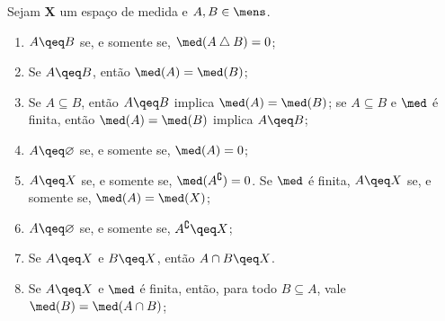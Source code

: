\begin{prop}
Sejam $\bm X$ um espaço de medida e $A,B \in \mens$.
	\begin{enumerate}
	\item $A \qeq B$ se, e somente se, $\med(A \difsim B) = 0$;
	\item Se $A \qeq B$, então $\med(A)=\med(B)$;
	\item Se $A \subseteq B$, então $A \qeq B$ implica $\med(A)=\med(B)$; se $A \subseteq B$ e $\med$ é finita, então $\med(A)=\med(B)$ implica $A \qeq B$;
	\item $A \qeq \emptyset$ se, e somente se, $\med(A)=0$;
	\item $A \qeq X$ se, e somente se, $\med(A^\complement)=0$. Se $\med$ é finita, $A \qeq X$ se, e somente se, $\med(A)=\med(X)$;
	\item $A \qeq \emptyset$ se, e somente se, $A^\complement \qeq X$;
	\item Se $A \qeq X$ e $B \qeq X$, então $A \cap B \qeq X$.
	\item Se $A \qeq X$ e $\med$ é finita, então, para todo $B \subseteq A$, vale $	\med(B) = \med(A \cap B)$;
	\end{enumerate}
\end{prop}
